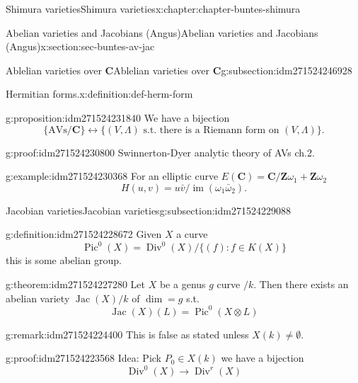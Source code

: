 \documentclass[oneside,10pt,]{book}
\numberwithin{equation}{section}
\newcommand{\ZZ}{\mathbf{Z}}
\newcommand{\CC}{\mathbf{C}}
\DeclareMathOperator{\divisors}{Div}
\DeclareMathOperator{\Pic}{Pic}
\DeclareMathOperator{\Jac}{Jac}
\DeclareMathOperator{\im}{im}
\begin{document}
\begin{chapterptx}{Shimura varieties}{}{Shimura varieties}{}{}{x:chapter:chapter-buntes-shimura}
\begin{sectionptx}{Abelian varieties and Jacobians (Angus)}{}{Abelian varieties and Jacobians (Angus)}{}{}{x:section:sec-buntes-av-jac}
\begin{subsectionptx}{Ablelian varieties over \(\CC\)}{}{Ablelian varieties over \(\CC\)}{}{}{g:subsection:idm271524246928}
\begin{definition}{Hermitian forms.}{x:definition:def-herm-form}
\end{definition}
\begin{proposition}{}{}{g:proposition:idm271524231840}%
We have a bijection%
\begin{equation*}
\{\text{AVs}/\CC\} \leftrightarrow \{(V,\Lambda)\text{ s.t. there is a Riemann form on } (V, \Lambda)\}\text{.}
\end{equation*}
%
\end{proposition}
\begin{proofptx}{}{g:proof:idm271524230800}
Swinnerton-Dyer analytic theory of AVs ch.2.%
\end{proofptx}
\begin{example}{}{g:example:idm271524230368}%
For an elliptic curve \(E(\CC) = \CC/ \ZZ \omega_1 + \ZZ \omega_2\)%
\begin{equation*}
H(u,v) = u\bar v/ \im(\omega_1 \bar \omega_2)\text{.}
\end{equation*}
%
\end{example}
\end{subsectionptx}
%
%
\typeout{************************************************}
\typeout{************************************************}
%
\begin{subsectionptx}{Jacobian varieties}{}{Jacobian varieties}{}{}{g:subsection:idm271524229088}
\begin{definition}{}{g:definition:idm271524228672}%
Given \(X\) a curve%
\begin{equation*}
\Pic^0(X) = \divisors^0(X)/\{(f) : f \in K(X)\}
\end{equation*}
this is some abelian group.%
\end{definition}
\begin{theorem}{}{}{g:theorem:idm271524227280}%
Let \(X\) be a genus \(g\) curve \(/k\). Then there exists an abelian variety \(\Jac(X)/k\) of \(\dim = g\) s.t.%
\begin{equation*}
\Jac(X)(L) = \Pic^0(X\otimes L)
\end{equation*}
%
\end{theorem}
\begin{remark}{}{g:remark:idm271524224400}%
This is false as stated unless \(X(k) \ne \emptyset\).%
\end{remark}
\begin{proofptx}{}{g:proof:idm271524223568}
Idea: Pick \(P_0 \in X(k)\) we have a bijection%
\begin{equation*}
\divisors^0(X) \to \divisors^r(X)
\end{equation*}

\end{proofptx}
\end{subsectionptx}
\end{sectionptx}
\end{chapterptx}
\end{document}
